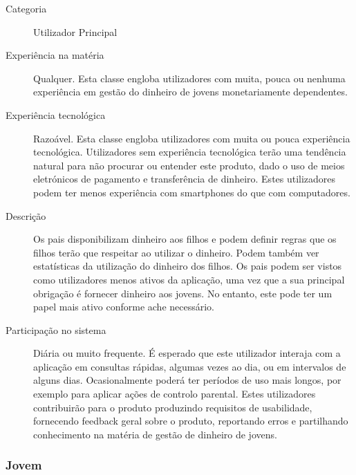 \documentclass[12pt,a4paper]{article}
\begin{document}
      \begin{description}
        \item[Categoria] Utilizador Principal
        \item[Experiência na matéria] Qualquer. Esta classe engloba utilizadores com muita, pouca ou nenhuma experiência em gestão do dinheiro de jovens monetariamente dependentes.
        \item[Experiência tecnológica] Razoável. Esta classe engloba utilizadores com muita ou pouca experiência tecnológica. Utilizadores sem experiência tecnológica terão uma tendência natural para não procurar ou entender este produto, dado o uso de meios eletrónicos de pagamento e transferência de dinheiro. Estes utilizadores podem ter menos experiência com smartphones do que com computadores.
        \item[Descrição] Os pais disponibilizam dinheiro aos filhos e podem definir regras que os filhos terão que respeitar ao utilizar o dinheiro. Podem também ver estatísticas da utilização do dinheiro dos filhos.
        Os pais podem ser vistos como utilizadores menos ativos da aplicação, uma vez que a sua principal obrigação é fornecer dinheiro aos jovens. No entanto, este pode ter um papel mais ativo conforme ache necessário.
        \item[Participação no sistema] Diária ou muito frequente. É esperado que este utilizador interaja com a aplicação em consultas rápidas, algumas vezes ao dia, ou em intervalos de alguns dias. Ocasionalmente poderá ter períodos de uso mais longos, por exemplo para aplicar ações de controlo parental. Estes utilizadores contribuirão para o produto produzindo requisitos de usabilidade, fornecendo feedback geral sobre o produto, reportando erros e partilhando conhecimento na matéria de gestão de dinheiro de jovens.
      \end{description}

    \subsubsection{Jovem}
\end{document}
